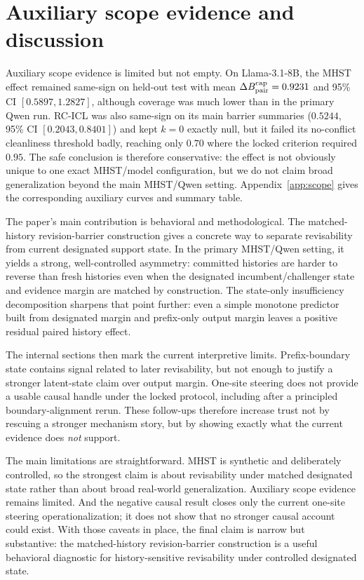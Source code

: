 \section{Auxiliary scope evidence and discussion}

Auxiliary scope evidence is limited but not empty. On Llama-3.1-8B, the MHST effect remained same-sign on held-out test with mean $\Delta B_{\mathrm{pair}}^{\mathrm{cap}} = 0.9231$ and 95\% CI $[0.5897, 1.2827]$, although coverage was much lower than in the primary Qwen run. RC-ICL was also same-sign on its main barrier summaries ($0.5244$, 95\% CI $[0.2043, 0.8401]$) and kept $k{=}0$ exactly null, but it failed its no-conflict cleanliness threshold badly, reaching only $0.70$ where the locked criterion required $0.95$. The safe conclusion is therefore conservative: the effect is not obviously unique to one exact MHST/model configuration, but we do not claim broad generalization beyond the main MHST/Qwen setting. Appendix~\ref{app:scope} gives the corresponding auxiliary curves and summary table.

The paper's main contribution is behavioral and methodological. The matched-history revision-barrier construction gives a concrete way to separate revisability from current designated support state. In the primary MHST/Qwen setting, it yields a strong, well-controlled asymmetry: committed histories are harder to reverse than fresh histories even when the designated incumbent/challenger state and evidence margin are matched by construction. The state-only insufficiency decomposition sharpens that point further: even a simple monotone predictor built from designated margin and prefix-only output margin leaves a positive residual paired history effect.

The internal sections then mark the current interpretive limits. Prefix-boundary state contains signal related to later revisability, but not enough to justify a stronger latent-state claim over output margin. One-site steering does not provide a usable causal handle under the locked protocol, including after a principled boundary-alignment rerun. These follow-ups therefore increase trust not by rescuing a stronger mechanism story, but by showing exactly what the current evidence does \emph{not} support.

The main limitations are straightforward. MHST is synthetic and deliberately controlled, so the strongest claim is about revisability under matched designated state rather than about broad real-world generalization. Auxiliary scope evidence remains limited. And the negative causal result closes only the current one-site steering operationalization; it does not show that no stronger causal account could exist. With those caveats in place, the final claim is narrow but substantive: the matched-history revision-barrier construction is a useful behavioral diagnostic for history-sensitive revisability under controlled designated state.
